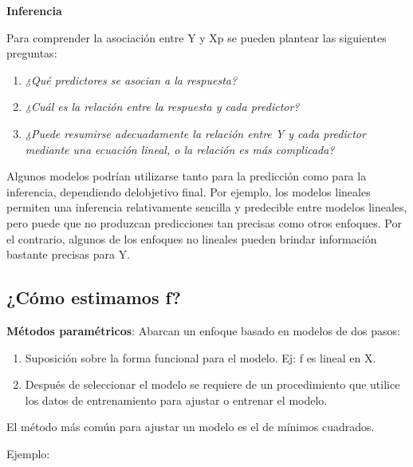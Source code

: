 \documentclass[
  letterpaper,
  DIV=11,
  numbers=noendperiod]{scrartcl}
\begin{document}
\textbf{Inferencia}

Para comprender la asociación entre Y y Xp se pueden plantear las
siguientes preguntas:

\begin{enumerate}
\def\labelenumi{\arabic{enumi}.}
\item
  \emph{¿Qué predictores se asocian a la respuesta?}
\item
  \emph{¿Cuál es la relación entre la respuesta y cada predictor?}
\item
  \emph{¿Puede resumirse adecuadamente la relación entre Y y cada
  predictor mediante una ecuación lineal, o la relación es más
  complicada?}
\end{enumerate}

Algunos modelos podrían utilizarse tanto para la predicción como para la
inferencia, dependiendo delobjetivo final. Por ejemplo, los modelos
lineales permiten una inferencia relativamente sencilla y predecible
entre modelos lineales, pero puede que no produzcan predicciones tan
precisas como otros enfoques. Por el contrario, algunos de los enfoques
no lineales pueden brindar información bastante precisas para Y.

\hypertarget{cuxf3mo-estimamos-f}{%
\subsection{¿Cómo estimamos f?}\label{cuxf3mo-estimamos-f}}

\textbf{Métodos paramétricos}: Abarcan un enfoque basado en modelos de
dos pasos:

\begin{enumerate}
\def\labelenumi{\arabic{enumi}.}
\item
  Suposición sobre la forma funcional para el modelo. Ej: f es lineal en
  X.
\item
  Después de seleccionar el modelo se requiere de un procedimiento que
  utilice los datos de entrenamiento para ajustar o entrenar el modelo.
\end{enumerate}

El método más común para ajustar un modelo es el de mínimos cuadrados.

Ejemplo:
\end{document}
